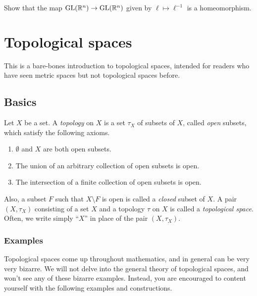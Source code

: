 \begin{exercise} \label{linear-map-inversion-homeomorphism} 
	Show that the map $\operatorname{GL}(\mathbb{R}^n) \to \operatorname{GL}(\mathbb{R}^n)$ given by $\ell \mapsto  \ell^{-1}$ is a homeomorphism. 
\end{exercise}

\section{Topological spaces} \label{topological-spaces}

This is a bare-bones introduction to topological spaces, intended for readers who have seen metric spaces but not topological spaces before. 

\subsection{Basics} \label{topological-spaces-basics}

\begin{definition} \label{topological-space-definition}   
	Let $X$ be a set. A \emph{topology} on $X$ is a set $\tau_X$ of subsets of $X$, called \emph{open} subsets, which satisfy the following axioms.
	\begin{enumerate}[(T1)]
		\item $\emptyset$ and $X$ are both open subsets. 
		\item The union of an arbitrary collection of open subsets is open. 
		\item The intersection of a finite collection of open subsets is open. 
	\end{enumerate}
	Also, a subset $F$ such that $X \setminus F$ is open is called a \emph{closed} subset of $X$. A pair $(X, \tau_X)$ consisting of a set $X$ and a topology $\tau$ on $X$ is called a \emph{topological space}. Often, we write simply ``$X$'' in place of the pair $(X, \tau_X)$. 
\end{definition}

\subsubsection*{Examples}

Topological spaces come up throughout mathematics, and in general can be very very bizarre. We will not delve into the general theory of topological spaces, and won't see any of these bizarre examples. Instead, you are encouraged to content yourself with the following examples and constructions. 

